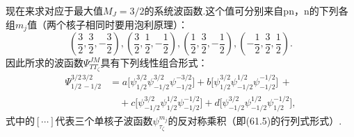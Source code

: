 \begin{xiti}
现在来求对应于最大值$M_J=3/2$的系统波函数.这个值可分别来自pn，n的下列各组$m_j$值（两个核子相同时要用泡利原理）：
\begin{equation*}
  \left(\frac{3}{2},\frac{3}{2},-\frac{3}{2}\right),
  \left(\frac{3}{2},\frac{1}{2},-\frac{1}{2}\right),
  \left(\frac{1}{2},\frac{3}{2},-\frac{1}{2}\right),
  \left(-\frac{1}{2},\frac{3}{2},\frac{1}{2}\right).
\end{equation*}
因此所求的波函数$\varPsi^{JM}_{TT_\zeta}$具有下列线性组合形式：
\begin{equation}
\begin{aligned}
  \varPsi^{3/2\,3/2}_{1/2\,-1/2}
  &=a\big[\psi^{3/2}_{1/2}\psi^{3/2}_{-1/2}\psi^{-3/2}_{-1/2}\big]
  +b\big[\psi^{3/2}_{1/2}\psi^{1/2}_{-1/2}\psi^{-1/2}_{-1/2}\big]\,+\\
  &\quad+c\big[\psi^{3/2}_{-1/2}\psi^{1/2}_{1/2}\psi^{-1/2}_{-1/2}\big]
  +d\big[\psi^{3/2}_{-1/2}\psi^{1/2}_{-1/2}\psi^{-1/2}_{1/2}\big],
\end{aligned}
\end{equation}
式中的$[\cdots]$代表三个单核子波函数$\psi^{m_j}_{\tau_\zeta}$的反对称乘积（即(61.5)的行列式形式）.


\end{xiti}
